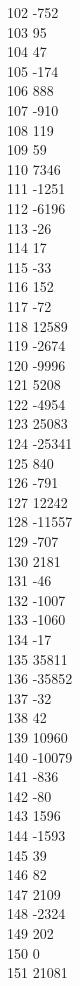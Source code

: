 { 102	-752 \\
 103	95 \\
 104	47 \\
 105	-174 \\
 106	888 \\
 107	-910 \\
 108	119 \\
 109	59 \\
 110	7346 \\
 111	-1251 \\
 112	-6196 \\
 113	-26 \\
 114	17 \\
 115	-33 \\
 116	152 \\
 117	-72 \\
 118	12589 \\
 119	-2674 \\
 120	-9996 \\
 121	5208 \\
 122	-4954 \\
 123	25083 \\
 124	-25341 \\
 125	840 \\
 126	-791 \\
 127	12242 \\
 128	-11557 \\
 129	-707 \\
 130	2181 \\
 131	-46 \\
 132	-1007 \\
 133	-1060 \\
 134	-17 \\
 135	35811 \\
 136	-35852 \\
 137	-32 \\
 138	42 \\
 139	10960 \\
 140	-10079 \\
 141	-836 \\
 142	-80 \\
 143	1596 \\
 144	-1593 \\
 145	39 \\
 146	82 \\
 147	2109 \\
 148	-2324 \\
 149	202 \\
 150	0 \\
 151	21081 \\
}

